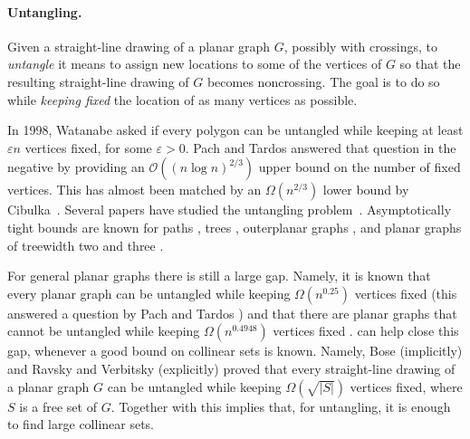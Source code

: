 
\paragraph{Untangling.}  Given a straight-line drawing of a planar
graph $G$, possibly with crossings, to \emph{untangle} it means to assign
new locations to some of the vertices of $G$ so that the resulting
straight-line drawing of $G$ becomes noncrossing. The goal is to do so while
\emph{keeping fixed} the location of
as many vertices as possible. %

In 1998, Watanabe asked if every polygon can be untangled while keeping at least $\varepsilon n$ vertices
fixed, for some $\varepsilon >0$. Pach and Tardos\cite{pt-up-02} answered that question in
the negative by providing an $\mathcal{O}((n\log n)^{2/3})$ upper bound on the
number of fixed vertices. This has almost been  matched by
an 
$\Omega(n^{2/3})$ lower bound by Cibulka~\cite{c-upg-10}. Several papers have studied the untangling
problem~\cite{pt-up-02,cano.toth.ea:upper,c-upg-10,bose.dujmovic.ea:polynomial,gkossw-upg-09, kpr-upg-11,ravsky.verbitsky:on}. Asymptotically tight
bounds are known for paths \cite{c-upg-10}, trees \cite{gkossw-upg-09}, outerplanar graphs
\cite{gkossw-upg-09}, and planar graphs of treewidth two and three \cite{ravsky.verbitsky:on,
  dalozzo.dujmovic.ea:drawing}. 
  
For general
planar graphs there is still a large gap. Namely, it is known that every planar graph can be untangled while
keeping $\Omega(n^{0.25})$ vertices fixed
\cite{bose.dujmovic.ea:polynomial} (this answered a 
question by Pach and Tardos \cite{pt-up-02})  and that there are planar graphs
that cannot be untangled while keeping $\Omega(n^{0.4948})$ vertices
fixed \cite{cano.toth.ea:upper}.  can help close this gap, whenever a good bound
on collinear sets is known.  %
Namely, Bose \etal\cite{bose.dujmovic.ea:polynomial} (implicitly) and  Ravsky and Verbitsky
\cite{ravsky.verbitsky:on} (explicitly) proved that every straight-line
drawing of a planar graph $G$ can be untangled while keeping
$\Omega(\sqrt{|S|})$ vertices fixed, where $S$ is a free set of
$G$. Together with  this implies that, for untangling, it is enough to
find large collinear sets.

